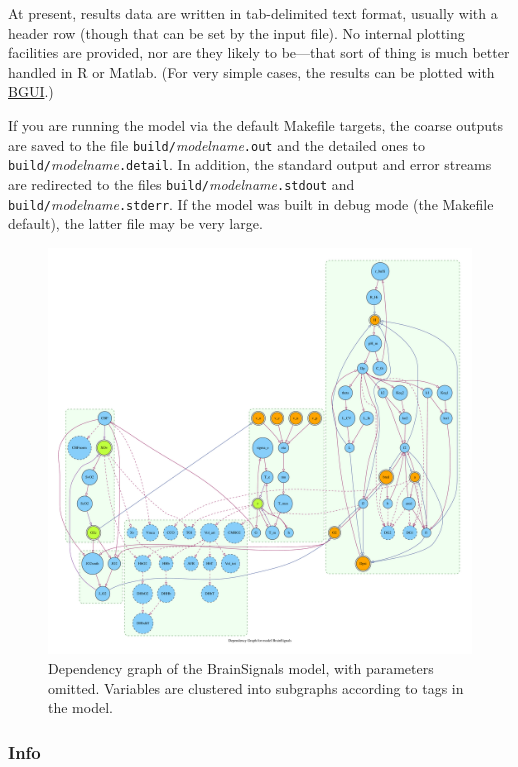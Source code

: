 \documentclass[a4paper,11pt]{article}
\begin{document}
At present, results data are written in tab-delimited text format, usually with a header row (though that can be set by the input file). No internal plotting facilities are provided, nor are they likely to be---that sort of thing is much better handled in R or Matlab. (For very simple cases, the results can be plotted with \hyperref[bgui]{BGUI}.)

If you are running the model via the default Makefile targets, the coarse outputs are saved to the file \texttt{build/}\textit{modelname}\texttt{.out} and the detailed ones to \texttt{build/}\textit{modelname}\texttt{.detail}. In addition, the standard output and error streams are redirected to the files \texttt{build/}\textit{modelname}\texttt{.stdout} and \texttt{build/}\textit{model\-name}\texttt{.stderr}. If the model was built in debug mode (the Makefile default), the latter file may be very large.

\begin{figure}[tbph]
\begin{center}
\includegraphics[scale=0.25]{figures/graph.pdf}
\caption{Dependency graph of the BrainSignals model, with parameters omitted. Variables are clustered into subgraphs according to tags in the model.}
\label{fig:graph}
\end{center}
\end{figure}

\subsubsection{Info}\label{info}
\end{document}
